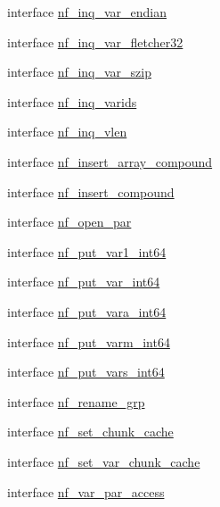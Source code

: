 \begin{DoxyCompactItemize}
\item 
interface \hyperlink{interfacenetcdf4__nf__interfaces_1_1nf__inq__var__endian}{nf\+\_\+inq\+\_\+var\+\_\+endian}
\item 
interface \hyperlink{interfacenetcdf4__nf__interfaces_1_1nf__inq__var__fletcher32}{nf\+\_\+inq\+\_\+var\+\_\+fletcher32}
\item 
interface \hyperlink{interfacenetcdf4__nf__interfaces_1_1nf__inq__var__szip}{nf\+\_\+inq\+\_\+var\+\_\+szip}
\item 
interface \hyperlink{interfacenetcdf4__nf__interfaces_1_1nf__inq__varids}{nf\+\_\+inq\+\_\+varids}
\item 
interface \hyperlink{interfacenetcdf4__nf__interfaces_1_1nf__inq__vlen}{nf\+\_\+inq\+\_\+vlen}
\item 
interface \hyperlink{interfacenetcdf4__nf__interfaces_1_1nf__insert__array__compound}{nf\+\_\+insert\+\_\+array\+\_\+compound}
\item 
interface \hyperlink{interfacenetcdf4__nf__interfaces_1_1nf__insert__compound}{nf\+\_\+insert\+\_\+compound}
\item 
interface \hyperlink{interfacenetcdf4__nf__interfaces_1_1nf__open__par}{nf\+\_\+open\+\_\+par}
\item 
interface \hyperlink{interfacenetcdf4__nf__interfaces_1_1nf__put__var1__int64}{nf\+\_\+put\+\_\+var1\+\_\+int64}
\item 
interface \hyperlink{interfacenetcdf4__nf__interfaces_1_1nf__put__var__int64}{nf\+\_\+put\+\_\+var\+\_\+int64}
\item 
interface \hyperlink{interfacenetcdf4__nf__interfaces_1_1nf__put__vara__int64}{nf\+\_\+put\+\_\+vara\+\_\+int64}
\item 
interface \hyperlink{interfacenetcdf4__nf__interfaces_1_1nf__put__varm__int64}{nf\+\_\+put\+\_\+varm\+\_\+int64}
\item 
interface \hyperlink{interfacenetcdf4__nf__interfaces_1_1nf__put__vars__int64}{nf\+\_\+put\+\_\+vars\+\_\+int64}
\item 
interface \hyperlink{interfacenetcdf4__nf__interfaces_1_1nf__rename__grp}{nf\+\_\+rename\+\_\+grp}
\item 
interface \hyperlink{interfacenetcdf4__nf__interfaces_1_1nf__set__chunk__cache}{nf\+\_\+set\+\_\+chunk\+\_\+cache}
\item 
interface \hyperlink{interfacenetcdf4__nf__interfaces_1_1nf__set__var__chunk__cache}{nf\+\_\+set\+\_\+var\+\_\+chunk\+\_\+cache}
\item 
interface \hyperlink{interfacenetcdf4__nf__interfaces_1_1nf__var__par__access}{nf\+\_\+var\+\_\+par\+\_\+access}
\end{DoxyCompactItemize}
